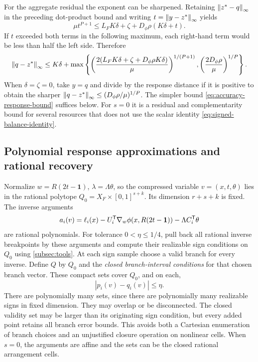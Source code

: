 For the aggregate residual the exponent can be sharpened. Retaining
$\left\lVert z^*-q\right\rVert_\infty$ in the preceding dot-product bound and writing
$t=\left\lVert y-z^*\right\rVert_\infty$ yields
\[
 \mu t^{P+1}\le L_FK\delta+\zeta+D_\phi\rho(K\delta+t).
\]
If $t$ exceeded both terms in the following maximum, each right-hand
term would be less than half the left side. Therefore
\begin{equation}\label{eq:accuracy-sharp-mismatch}
 \left\lVert q-z^*\right\rVert_\infty\le K\delta+
 \max\left\{
 \left(\frac{2(L_FK\delta+\zeta+D_\phi\rho K\delta)}\mu\right)^{1/(P+1)},
 \left(\frac{2D_\phi\rho}\mu\right)^{1/P}\right\}.
\end{equation}
When $\delta=\zeta=0$, take $y=q$ and divide by the response distance
if it is positive to obtain the sharper
$\left\lVert q-z^*\right\rVert_\infty\le(D_\phi\rho/\mu)^{1/P}$.
The simpler bound \eqref{eq:accuracy-response-bound} suffices below.
For $s=0$ it is a residual and complementarity bound for several
resources that does not use the scalar identity
\eqref{eq:signed-balance-identity}.

\subsection{Polynomial response approximations and rational recovery}
\label{subsec:accuracy-graph}

Normalize $w=R(2t-\mathbf1)$, $\lambda=\Lambda\theta$, so the
compressed variable $v=(x,t,\theta)$ lies in the rational polytope
$Q_0=X_F\times[0,1]^{s+k}$. Its dimension $r+s+k$ is fixed.
The inverse arguments
\[
 a_i(v)=\ell_i(x)-U_i^{\mathsf T}\nabla_w\phi(x,R(2t-\mathbf1))
                                           -\Lambda C_i^{\mathsf T}\theta
\]
are rational polynomials. For tolerance $0<\eta\le1/4$, pull back
all rational inverse breakpoints by these arguments and compute their
realizable sign conditions on $Q_0$ using \cref{subsec:tools}.
At each sign sample choose a valid branch for every inverse. Define
$Q$ by $Q_0$ and the \emph{closed branch-interval conditions} for that
chosen branch vector. These compact sets cover $Q_0$, and on each,
\begin{equation}\label{eq:accuracy-valid-branches}
                     |p_i(v)-q_i(v)|\le\eta.
\end{equation}
There are polynomially many sets, since there are polynomially many
realizable signs in fixed dimension. They may overlap or be disconnected.
The closed validity set may be larger than its originating sign
condition, but every added point retains all branch error bounds. This
avoids both a Cartesian enumeration of branch choices and an unjustified
closure operation on nonlinear cells. When $s=0$, the arguments are
affine and the sets can be the closed rational arrangement cells.

